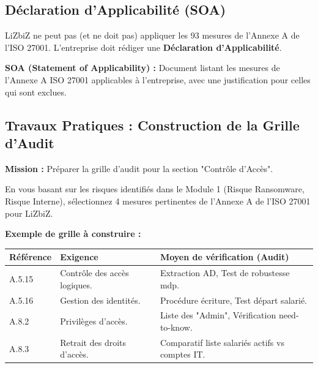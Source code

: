 \subsection{Déclaration d'Applicabilité (SOA)}

LiZbiZ ne peut pas (et ne doit pas) appliquer les 93 mesures de l'Annexe A de l'ISO 27001. L'entreprise doit rédiger une \textbf{Déclaration d'Applicabilité}.

\begin{boxdef}
\textbf{SOA (Statement of Applicability) :} Document listant les mesures de l'Annexe A ISO 27001 applicables à l'entreprise, avec une justification pour celles qui sont exclues.
\end{boxdef}

\subsection{Travaux Pratiques : Construction de la Grille d'Audit}

\begin{boxlizbiz}
\textbf{Mission :} Préparer la grille d'audit pour la section "Contrôle d'Accès".

En vous basant sur les risques identifiés dans le Module 1 (Risque Ransomware, Risque Interne), sélectionnez 4 mesures pertinentes de l'Annexe A de l'ISO 27001 pour LiZbiZ.

\textbf{Exemple de grille à construire :}
\begin{table}[htbp]
\centering
\small
\begin{tabular}{p{2cm}p{6cm}p{4cm}}
    \toprule
    \textbf{Référence} & \textbf{Exigence} & \textbf{Moyen de vérification (Audit)} \\
    \midrule
    A.5.15 & Contrôle des accès logiques. & Extraction AD, Test de robustesse mdp. \\
    A.5.16 & Gestion des identités. & Procédure écriture, Test départ salarié. \\
    A.8.2 & Privilèges d'accès. & Liste des "Admin", Vérification need-to-know. \\
    A.8.3 & Retrait des droits d'accès. & Comparatif liste salariés actifs vs comptes IT. \\
    \bottomrule
\end{tabular}
\end{table}
\end{boxlizbiz}

